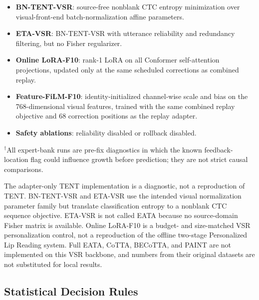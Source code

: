 \begin{itemize}
  \item \textbf{BN-TENT-VSR}: source-free nonblank CTC entropy minimization over visual-front-end batch-normalization affine parameters.
  \item \textbf{ETA-VSR}: BN-TENT-VSR with utterance reliability and redundancy filtering, but no Fisher regularizer.
  \item \textbf{Online LoRA-F10}: rank-1 LoRA on all Conformer self-attention projections, updated only at the same scheduled corrections as combined replay.
  \item \textbf{Feature-FiLM-F10}: identity-initialized channel-wise scale and bias on the 768-dimensional visual features, trained with the same combined replay objective and 68 correction positions as the replay adapter.
  \item \textbf{Safety ablations}: reliability disabled or rollback disabled.
\end{itemize}

$^{\dagger}$All expert-bank runs are pre-fix diagnostics in which the known feedback-location flag could influence growth before prediction; they are not strict causal comparisons.

The adapter-only TENT implementation is a diagnostic, not a reproduction of TENT. BN-TENT-VSR and ETA-VSR use the intended visual normalization parameter family but translate classification entropy to a nonblank CTC sequence objective. ETA-VSR is not called EATA because no source-domain Fisher matrix is available. Online LoRA-F10 is a budget- and size-matched VSR personalization control, not a reproduction of the offline two-stage Personalized Lip Reading system. Full EATA, CoTTA, BECoTTA, and PAINT are not implemented on this VSR backbone, and numbers from their original datasets are not substituted for local results.

\subsection{Statistical Decision Rules}

